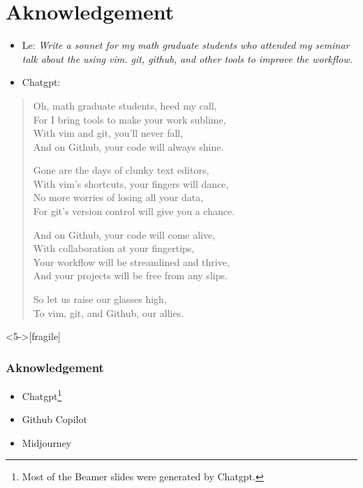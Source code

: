 \documentclass[9pt,table,xcolor=dvipsnames]{beamer}%
\theoremstyle{definition}
\theoremstyle{plain}
\begin{document}
\section{Aknowledgement}
\begin{frame}[fragile,t] %
  \begin{itemize}
    \item Le: {\small \it Write a sonnet for my math graduate students who
      attended my seminar talk about the using vim. git, github, and other
    tools to improve the workflow.}
    \vfill
    \item Chatgpt:
  \end{itemize}
   \begin{quotation}
      Oh, math graduate students, heed my call,         \\
      For I bring tools to make your work sublime,      \\
      With vim and git, you'll never fall,              \\
      And on Github, your code will always shine.       \\ \bigskip

      Gone are the days of clunky text editors,         \\
      With vim's shortcuts, your fingers will dance,    \\
      No more worries of losing all your data,          \\
      For git's version control will give you a chance. \\ \bigskip

      And on Github, your code will come alive,         \\
      With collaboration at your fingertips,            \\
      Your workflow will be streamlined and thrive,     \\
      And your projects will be free from any slips.    \\ \bigskip

      So let us raise our glasses high,                 \\
      To vim, git, and Github, our allies.              \\
   \end{quotation}
\end{frame}
\begin{frame}<5->[fragile] %
  \frametitle{Aknowledgement}

  \begin{center}
    \begin{minipage}{0.3\textwidth}
      \Large
      \begin{itemize}
        \item Chatgpt\footnote{Most of the Beamer slides were generated by Chatgpt.} \bigskip
        \item Github Copilot \bigskip
        \item Midjourney \bigskip
      \end{itemize}
    \end{minipage}
  \end{center}


\end{frame}
\end{document}
